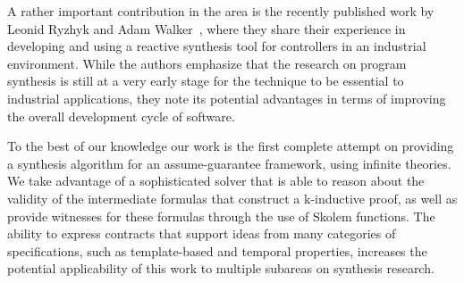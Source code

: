 A rather important contribution in the area is the recently published work by
Leonid Ryzhyk and Adam Walker~\cite{ryzhykdeveloping}, where they share their
experience in developing and using a reactive synthesis tool for controllers in
an industrial environment. While the authors emphasize that the research on
program synthesis is still at a very early stage for the technique to be
essential to industrial applications, they note its potential advantages in terms
of improving the overall development cycle of software.

To the best of our knowledge our work is the first complete attempt on providing
a synthesis algorithm for an assume-guarantee framework, using infinite theories.
We take advantage of a sophisticated solver that is able to reason about the
validity of the intermediate formulas that construct a k-inductive proof, as
well as provide witnesses for these formulas through the use of Skolem
functions. The ability to express contracts that support ideas from many
categories of specifications, such as template-based and temporal properties,
increases the potential applicability of this work to multiple subareas on
synthesis research.
\label{sec:related}
